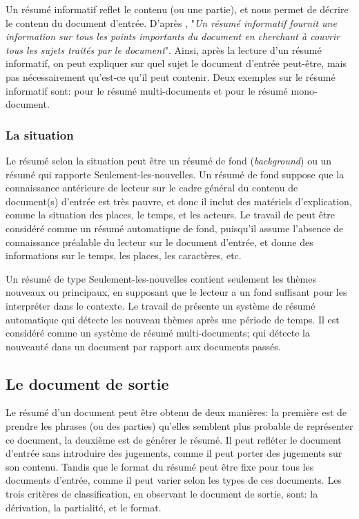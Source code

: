 \documentclass[a4paper,12pt,oneside]{../use/ESIthesis}
\begin{document}
Un résumé informatif reflet le contenu (ou une partie), et nous permet de décrire le contenu du document d'entrée. 
D'après \cite{04-crispino-couto}, "\textit{Un résumé informatif fournit une information sur tous les points importants du document en cherchant à couvrir tous les sujets traités par le document}".
Ainsi, après la lecture d'un résumé informatif, on peut expliquer sur quel sujet le document d'entrée peut-être, mais pas nécessairement qu'est-ce qu'il peut contenir. 
Deux exemples sur le résumé informatif sont: \cite{09-boudin-torresmoreno} pour le résumé multi-documents et \cite{05-usunier-al} pour le résumé mono-document.

\subsubsection{La situation}

Le résumé selon la situation peut être un résumé de fond (\textit{background}) ou un résumé qui rapporte Seulement-les-nouvelles. 
Un résumé de fond suppose que la connaissance antérieure de lecteur sur le cadre général du contenu de document(s) d'entrée est très pauvre, et donc il inclut des matériels d'explication, comme la situation des places, le temps, et les acteurs. 
Le travail de \cite{06-kazantseva} peut être considéré comme un résumé automatique de fond, puisqu'il assume l'absence de connaissance préalable du lecteur sur le document d'entrée, et donne des informations sur le temps, les places, les caractères, etc.

Un résumé de type Seulement-les-nouvelles contient seulement les thèmes nouveaux ou principaux, en supposant que le lecteur a un fond suffisant pour les interpréter dans le contexte.
Le travail de \cite{10-bysani} présente un système de résumé automatique qui détecte les nouveau thèmes après une période de temps. 
Il est considéré comme un système de résumé multi-documents; qui détecte la nouveauté dans un document par rapport aux documents passés.

\subsection{Le document de sortie}

Le résumé d'un document peut être obtenu de deux manières: la première est de prendre les phrases (ou des parties) qu'elles semblent plus probable de représenter ce document, la deuxième est de générer le résumé. 
Il peut refléter le document d'entrée sans introduire des jugements, comme il peut porter des jugements sur son contenu.
Tandis que le format du résumé peut être fixe pour tous les documents d'entrée, comme il peut varier selon les types de ces documents.
Les trois critères de classification, en observant le document de sortie, sont: la dérivation, la partialité, et le format.
\end{document}
